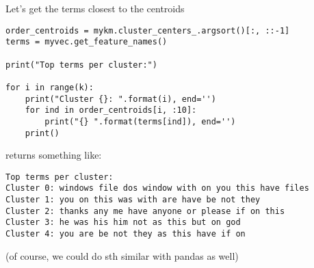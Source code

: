\begin{frame}{Let's get the terms closest to the centroids}
\begin{lstlisting}
order_centroids = mykm.cluster_centers_.argsort()[:, ::-1]
terms = myvec.get_feature_names()

print("Top terms per cluster:")

for i in range(k):
    print("Cluster {}: ".format(i), end='')
    for ind in order_centroids[i, :10]:
        print("{} ".format(terms[ind]), end='')
    print()

\end{lstlisting}
\pause
returns something like:

\begin{lstlisting}
Top terms per cluster:
Cluster 0: windows file dos window with on you this have files 
Cluster 1: you on this was with are have be not they 
Cluster 2: thanks any me have anyone or please if on this 
Cluster 3: he was his him not as this but on god 
Cluster 4: you are be not they as this have if on 
\end{lstlisting}
(of course, we could do sth similar with pandas as well)
\end{frame}




